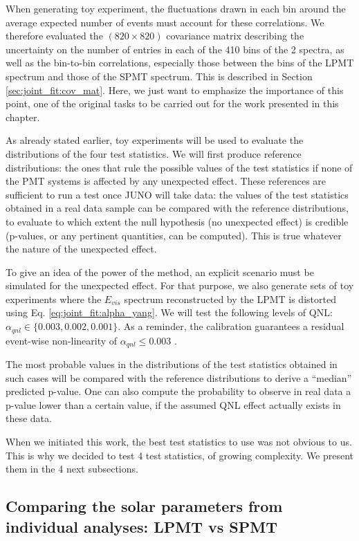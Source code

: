 \documentclass[../main.tex]{subfiles}
\begin{document}
When generating toy experiment, the fluctuations drawn in each bin around the average expected number of events must account for these correlations. We therefore evaluated the $(820 \times 820)$ covariance matrix describing the uncertainty on the number of entries in each of the 410 bins of the 2 spectra, as well as the bin-to-bin correlations, especially those between the bins of the LPMT spectrum and those of the SPMT spectrum. This is described in Section \ref{sec:joint_fit:cov_mat}. Here, we just want to emphasize the importance of this point, one of the original tasks to be carried out for the work presented in this chapter.

As already stated earlier, toy experiments will be used to evaluate the distributions of the four test statistics. We will first produce reference distributions: the ones that rule the possible values of the test statistics if none of the PMT systems is affected by any unexpected effect. These references are sufficient to run a test once JUNO will take data: the values of the test statistics  obtained in a real data sample can be compared with the reference distributions, to evaluate to which extent the null hypothesis (no unexpected effect) is credible (p-values, or any pertinent quantities, can be computed). This is true whatever the nature of the unexpected effect.

To give an idea of the power of the method, an explicit scenario must be simulated for the unexpected effect. For that purpose, we also generate sets of toy experiments where the $E_{vis}$ spectrum reconstructed by the LPMT is distorted using Eq. \ref{eq:joint_fit:alpha_yang}. We will test the following levels of QNL: $\alpha_{qnl} \in \{0.003, 0.002, 0.001\}$. As a reminder, the calibration guarantees a residual event-wise non-linearity of $\alpha_{qnl} \leq 0.003$ \cite{juno_collaboration_calibration_2021}.

The most probable values in the distributions of the test statistics obtained in such cases will be compared with the reference distributions to derive a ``median'' predicted p-value. One can also compute the probability to observe in real data a p-value lower than a certain value, if the assumed QNL effect actually exists in these data.

When we initiated this work, the best test statistics to use was not obvious to us. This is why we decided to test 4 test statistics, of growing complexity. We present them in the 4 next subsections.

\subsection{Comparing the solar parameters from individual analyses: LPMT vs SPMT}
\label{sec:joint_fit:approach:comp}
\end{document}
